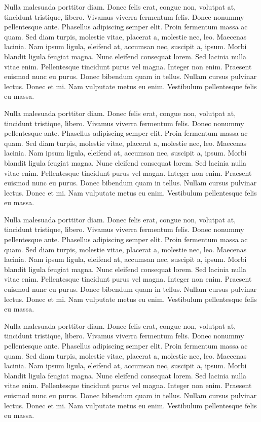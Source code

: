 \documentclass[numbers,webpdf]{ima-authoring-template}%
\theoremstyle{thmstyletwo}%
\numberwithin{equation}{section}
\begin{document}
Nulla malesuada porttitor diam. Donec felis erat, congue non, volutpat at, tincidunt tristique, libero. Vivamus
viverra fermentum felis. Donec nonummy pellentesque ante. Phasellus adipiscing semper elit. Proin fermentum massa
ac quam. Sed diam turpis, molestie vitae, placerat a, molestie nec, leo. Maecenas lacinia. Nam ipsum ligula, eleifend
at, accumsan nec, suscipit a, ipsum. Morbi blandit ligula feugiat magna. Nunc eleifend consequat lorem. Sed lacinia
nulla vitae enim. Pellentesque tincidunt purus vel magna. Integer non enim. Praesent euismod nunc eu purus. Donec
bibendum quam in tellus. Nullam cursus pulvinar lectus. Donec et mi. Nam vulputate metus eu enim. Vestibulum
pellentesque felis eu massa.

Nulla malesuada porttitor diam. Donec felis erat, congue non, volutpat at, tincidunt tristique, libero. Vivamus
viverra fermentum felis. Donec nonummy pellentesque ante. Phasellus adipiscing semper elit. Proin fermentum massa
ac quam. Sed diam turpis, molestie vitae, placerat a, molestie nec, leo. Maecenas lacinia. Nam ipsum ligula, eleifend
at, accumsan nec, suscipit a, ipsum. Morbi blandit ligula feugiat magna. Nunc eleifend consequat lorem. Sed lacinia
nulla vitae enim. Pellentesque tincidunt purus vel magna. Integer non enim. Praesent euismod nunc eu purus. Donec
bibendum quam in tellus. Nullam cursus pulvinar lectus. Donec et mi. Nam vulputate metus eu enim. Vestibulum
pellentesque felis eu massa.

Nulla malesuada porttitor diam. Donec felis erat, congue non, volutpat at, tincidunt tristique, libero. Vivamus
viverra fermentum felis. Donec nonummy pellentesque ante. Phasellus adipiscing semper elit. Proin fermentum massa
ac quam. Sed diam turpis, molestie vitae, placerat a, molestie nec, leo. Maecenas lacinia. Nam ipsum ligula, eleifend
at, accumsan nec, suscipit a, ipsum. Morbi blandit ligula feugiat magna. Nunc eleifend consequat lorem. Sed lacinia
nulla vitae enim. Pellentesque tincidunt purus vel magna. Integer non enim. Praesent euismod nunc eu purus. Donec
bibendum quam in tellus. Nullam cursus pulvinar lectus. Donec et mi. Nam vulputate metus eu enim. Vestibulum
pellentesque felis eu massa.

Nulla malesuada porttitor diam. Donec felis erat, congue non, volutpat at, tincidunt tristique, libero. Vivamus
viverra fermentum felis. Donec nonummy pellentesque ante. Phasellus adipiscing semper elit. Proin fermentum massa
ac quam. Sed diam turpis, molestie vitae, placerat a, molestie nec, leo. Maecenas lacinia. Nam ipsum ligula, eleifend
at, accumsan nec, suscipit a, ipsum. Morbi blandit ligula feugiat magna. Nunc eleifend consequat lorem. Sed lacinia
nulla vitae enim. Pellentesque tincidunt purus vel magna. Integer non enim. Praesent euismod nunc eu purus. Donec
bibendum quam in tellus. Nullam cursus pulvinar lectus. Donec et mi. Nam vulputate metus eu enim. Vestibulum
pellentesque felis eu massa.
\end{document}
